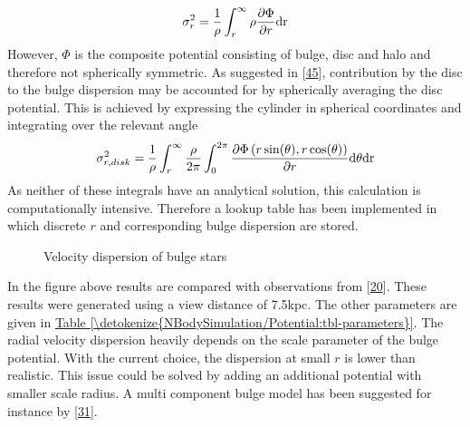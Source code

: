 \documentclass[letterpaper,10pt,english]{sphinxmanual}
\begin{document}
					\begin{equation*}
					\begin{split}\sigma_r^2 = \frac{1}{\rho}\int_{r}^{\infty}\rho \frac{\partial \Phi}{\partial r}\textup{dr}\end{split}
					\end{equation*}
					\sphinxAtStartPar
					However, \(\Phi\) is the composite potential consisting of bulge, disc and halo and therefore not spherically symmetric. As suggested in {[}\hyperlink{cite.NBodySimulation/Appendix:id19}{45}{]}, contribution by the disc to the bulge dispersion may be accounted for by spherically averaging the disc potential.
					This is achieved by expressing the cylinder in spherical coordinates and integrating over the relevant angle
					\begin{equation*}
					\begin{split}\sigma_{r,disk}^2 = \frac{1}{\rho}\int_{r}^{\infty}
					\frac{\rho }{2\pi}  \int_0^{2\pi} \frac{\partial \Phi\left ( r\sin(\theta ),r\cos(\theta ) \right )}{\partial r} \textup{d}\theta \textup{dr} \\\end{split}
					\end{equation*}
					\sphinxAtStartPar
					As neither of these integrals have an analytical solution, this calculation is computationally intensive.
					Therefore a lookup table has been implemented in which discrete \(r\) and corresponding bulge dispersion are stored.
					
					\begin{figure}[htbp]
					\centering
					\capstart
					
					\noindent{}
					\caption{Velocity dispersion of bulge stars}\label{\detokenize{NBodySimulation/Initialization:id46}}\end{figure}
					
					\sphinxAtStartPar
					In the figure above results are compared with observations from {[}\hyperlink{cite.NBodySimulation/Appendix:id21}{20}{]}. These results were generated using a view distance of 7.5kpc.
					The other parameters are given in \hyperref[\detokenize{NBodySimulation/Potential:tbl-parameters}]{Table \ref{\detokenize{NBodySimulation/Potential:tbl-parameters}}}. The radial velocity dispersion heavily depends on the scale parameter of the bulge potential.
					With the current choice, the dispersion at small \(r\) is lower than realistic. This issue could be solved by adding an additional potential with smaller scale radius.
					A multi component bulge model has been suggested for instance by {[}\hyperlink{cite.NBodySimulation/Appendix:id22}{31}{]}.
\end{document}
